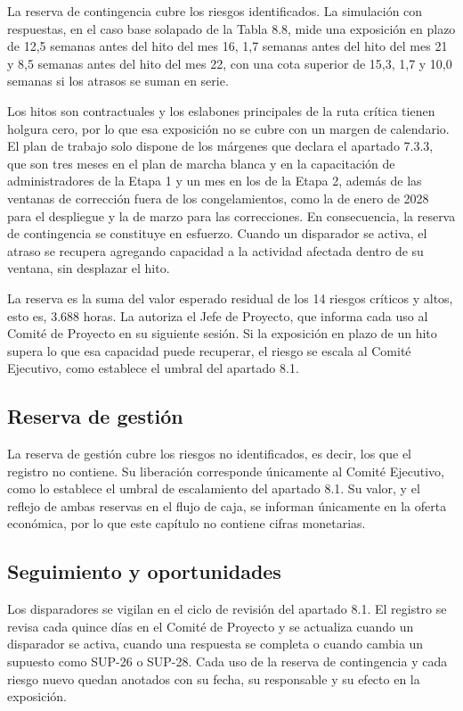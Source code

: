 \documentclass[11pt]{article}
\begin{document}
La reserva de contingencia cubre los riesgos identificados. La simulación con respuestas, en el caso base solapado de la Tabla 8.8, mide una exposición en plazo de 12,5 semanas antes del hito del mes 16, 1,7 semanas antes del hito del mes 21 y 8,5 semanas antes del hito del mes 22, con una cota superior de 15,3, 1,7 y 10,0 semanas si los atrasos se suman en serie.

Los hitos son contractuales y los eslabones principales de la ruta crítica tienen holgura cero, por lo que esa exposición no se cubre con un margen de calendario. El plan de trabajo solo dispone de los márgenes que declara el apartado 7.3.3, que son tres meses en el plan de marcha blanca y en la capacitación de administradores de la Etapa 1 y un mes en los de la Etapa 2, además de las ventanas de corrección fuera de los congelamientos, como la de enero de 2028 para el despliegue y la de marzo para las correcciones. En consecuencia, la reserva de contingencia se constituye en esfuerzo. Cuando un disparador se activa, el atraso se recupera agregando capacidad a la actividad afectada dentro de su ventana, sin desplazar el hito.

La reserva es la suma del valor esperado residual de los 14 riesgos críticos y altos, esto es, 3.688 horas. La autoriza el Jefe de Proyecto, que informa cada uso al Comité de Proyecto en su siguiente sesión. Si la exposición en plazo de un hito supera lo que esa capacidad puede recuperar, el riesgo se escala al Comité Ejecutivo, como establece el umbral del apartado 8.1.

\subsection{Reserva de gestión}

La reserva de gestión cubre los riesgos no identificados, es decir, los que el registro no contiene. Su liberación corresponde únicamente al Comité Ejecutivo, como lo establece el umbral de escalamiento del apartado 8.1. Su valor, y el reflejo de ambas reservas en el flujo de caja, se informan únicamente en la oferta económica, por lo que este capítulo no contiene cifras monetarias.

\subsection{Seguimiento y oportunidades}

Los disparadores se vigilan en el ciclo de revisión del apartado 8.1. El registro se revisa cada quince días en el Comité de Proyecto y se actualiza cuando un disparador se activa, cuando una respuesta se completa o cuando cambia un supuesto como SUP-26 o SUP-28. Cada uso de la reserva de contingencia y cada riesgo nuevo quedan anotados con su fecha, su responsable y su efecto en la exposición.
\end{document}
